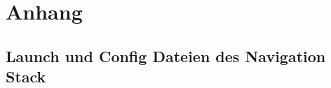 \section{Anhang}
\label{sec:appendix}
\subsection{Launch und Config Dateien des Navigation Stack}
\label{subsec:appendixNS}






